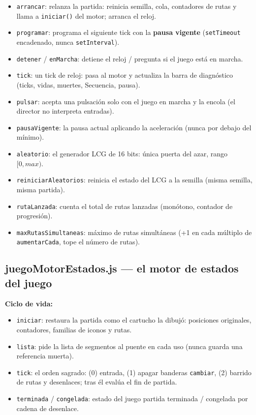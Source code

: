 \documentclass[../main.tex]{subfiles}
\begin{document}
\begin{itemize}
	\item \texttt{arrancar}: relanza la partida: reinicia semilla, cola,
	contadores de rutas y llama a \texttt{iniciar()} del motor; arranca
	el reloj.
	\item \texttt{programar}: programa el siguiente tick con la
	\textbf{pausa vigente} (\texttt{setTimeout} encadenado, nunca
	\texttt{setInterval}).
	\item \texttt{detener} / \texttt{enMarcha}: detiene el reloj /
	pregunta si el juego está en marcha.
	\item \texttt{tick}: un tick de reloj: pasa al motor y actualiza la
	barra de diagnóstico (ticks, vidas, muertes, Secuencia, pausa).
	\item \texttt{pulsar}: acepta una pulsación solo con el juego en
	marcha y la encola (el director no interpreta entradas).
	\item \texttt{pausaVigente}: la pausa actual aplicando la
	aceleración (nunca por debajo del mínimo).
	\item \texttt{aleatorio}: el generador LCG de 16 bits: única puerta
	del azar, rango $[0, max)$.
	\item \texttt{reiniciarAleatorios}: reinicia el estado del LCG a la
	semilla (misma semilla, misma partida).
	\item \texttt{rutaLanzada}: cuenta el total de rutas lanzadas
	(monótono, contador de progresión).
	\item \texttt{maxRutasSimultaneas}: máximo de rutas simultáneas (+1
	en cada múltiplo de \texttt{aumentarCada}, tope el número de rutas).
\end{itemize}

\subsection*{juegoMotorEstados.js — el motor de estados del juego}

\textbf{Ciclo de vida:}
\begin{itemize}
	\item \texttt{iniciar}: restaura la partida como el cartucho la
	dibujó: posiciones originales, contadores, familias de iconos y
	rutas.
	\item \texttt{lista}: pide la lista de segmentos al puente en cada
	uso (nunca guarda una referencia muerta).
	\item \texttt{tick}: el orden sagrado: (0) entrada, (1) apagar
	banderas \texttt{cambiar}, (2) barrido de rutas y desenlaces; tras
	él evalúa el fin de partida.
	\item \texttt{terminada} / \texttt{congelada}: estado del juego
	partida terminada / congelada por cadena de desenlace.
\end{itemize}
\end{document}
